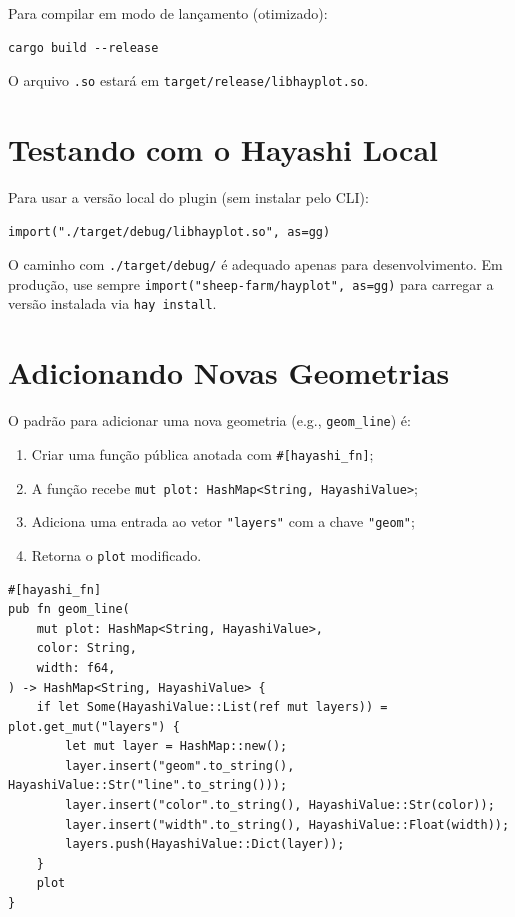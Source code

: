 \documentclass[12pt, a4paper, oneside]{book}
\newcommand{\code}[1]{\texttt{#1}}
\begin{document}
Para compilar em modo de lançamento (otimizado):

\begin{lstlisting}[style=inline]
cargo build --release
\end{lstlisting}

O arquivo \code{.so} estará em \code{target/release/libhayplot.so}.

\section{Testando com o Hayashi Local}

Para usar a versão local do plugin (sem instalar pelo CLI):

\begin{lstlisting}[caption={Carregando o .so compilado localmente}]
import("./target/debug/libhayplot.so", as=gg)
\end{lstlisting}

\begin{warnbox}[title={\textbf{Atenção}}]
  O caminho com \code{./target/debug/} é adequado apenas para desenvolvimento.
  Em produção, use sempre \code{import("sheep-farm/hayplot", as=gg)} para
  carregar a versão instalada via \code{hay install}.
\end{warnbox}


\section{Adicionando Novas Geometrias}

O padrão para adicionar uma nova geometria (e.g., \code{geom\_line}) é:

\begin{enumerate}
  \item Criar uma função pública anotada com \code{\#[hayashi\_fn]};
  \item A função recebe \code{mut plot: HashMap<String, HayashiValue>};
  \item Adiciona uma entrada ao vetor \code{"layers"} com a chave \code{"geom"};
  \item Retorna o \code{plot} modificado.
\end{enumerate}

\begin{lstlisting}[caption={Estrutura de uma nova geometria em Rust}]
#[hayashi_fn]
pub fn geom_line(
    mut plot: HashMap<String, HayashiValue>,
    color: String,
    width: f64,
) -> HashMap<String, HayashiValue> {
    if let Some(HayashiValue::List(ref mut layers)) = plot.get_mut("layers") {
        let mut layer = HashMap::new();
        layer.insert("geom".to_string(),  HayashiValue::Str("line".to_string()));
        layer.insert("color".to_string(), HayashiValue::Str(color));
        layer.insert("width".to_string(), HayashiValue::Float(width));
        layers.push(HayashiValue::Dict(layer));
    }
    plot
}
\end{lstlisting}
\end{document}
